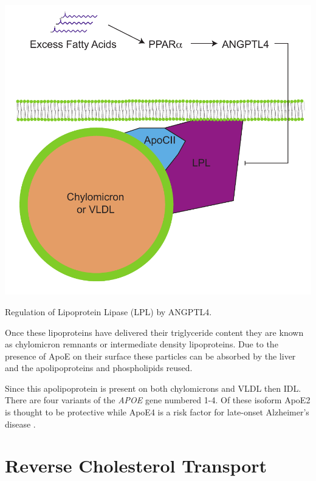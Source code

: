 \documentclass{tufte-handout}
\begin{document}
\begin{marginfigure}
\includegraphics{figures/Angptl4-PPARa.pdf}
\caption{Regulation of Lipoprotein Lipase (LPL) by ANGPTL4.}
\label{fig:angptl4}
\end{marginfigure}

  Once these lipoproteins have delivered their triglyceride content they are known as chylomicron remnants or intermediate density lipoproteins.  Due to the presence of ApoE on their surface these particles can be absorbed by the liver and the apolipoproteins and phospholipids reused.

  Since this apolipoprotein is present on both chylomicrons and VLDL then IDL.  There are four variants of the \textit{APOE} gene numbered 1-4.  Of these isoform ApoE2 is thought to be protective while ApoE4 is a risk factor for late-onset Alzheimer's disease \citep{Poirier1993,Corder1993}.  

\section{Reverse Cholesterol Transport}
\end{document}
